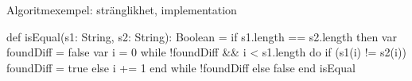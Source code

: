 \begin{Slide}{Algoritmexempel: stränglikhet, implementation}\SlideFontSmall
\begin{Code}
def isEqual(s1: String, s2: String): Boolean = 
  if s1.length == s2.length then
    var foundDiff = false
    var i = 0
    while !foundDiff && i < s1.length do
      if (s1(i) != s2(i)) foundDiff = true
      else i += 1
    end while
    !foundDiff
  else false
end isEqual
\end{Code}



\end{Slide}
 







